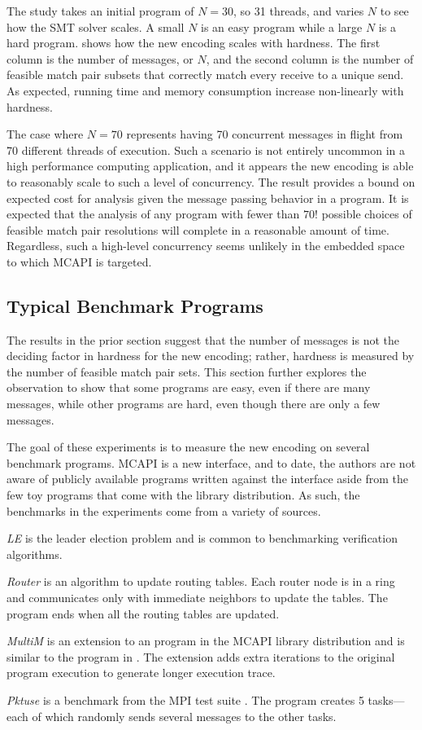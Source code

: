 The study takes an initial program of $N = 30$, so 31 threads, and
varies $N$ to see how the SMT solver scales. A small $N$ is an easy
program while a large $N$ is a hard program. 
shows how the new encoding scales with hardness. The first column is
the number of messages, or $N$, and the second column is the number of
feasible match pair subsets that correctly match every receive to a
unique send. As expected, running time and memory consumption increase
non-linearly with hardness.

The case where $N=70$ represents having 70 concurrent messages in
flight from 70 different threads of execution. Such a scenario is not
entirely uncommon in a high performance computing application, and it
appears the new encoding is able to reasonably scale to such a level
of concurrency. The result provides a bound on expected cost for
analysis given the message passing behavior in a program. It is
expected that the analysis of any program with fewer than $70!$
possible choices of feasible match pair resolutions will complete in a
reasonable amount of time. Regardless, such a high-level concurrency
seems unlikely in the embedded space to which MCAPI is targeted.

\subsection{Typical Benchmark Programs}
The results in the prior section suggest that the number of messages
is not the deciding factor in hardness for the new encoding; rather,
hardness is measured by the number of feasible match pair sets. This
section further explores the observation to show that some programs
are easy, even if there are many messages, while other programs are
hard, even though there are only a few messages.

The goal of these experiments is to measure the new encoding on
several benchmark programs. MCAPI is a new interface, and to date, the
authors are not aware of publicly available programs written against
the interface aside from the few toy programs that come with the
library distribution. As such, the benchmarks in the experiments come
from a variety of sources.
\begin{compactitem}
\item \textit{LE} is the leader election problem and is common to
  benchmarking verification algorithms.
\item \textit{Router} is an algorithm to update routing tables. Each
  router node is in a ring and communicates only with immediate
  neighbors to update the tables. The program ends when all the
  routing tables are updated.
\item \textit{MultiM} is an extension to an program in the MCAPI library
  distribution and is similar to the program in . The extension adds extra
  iterations to the original program execution to generate longer
  execution trace.
\item \textit{Pktuse} is a benchmark from the MPI test suite
  \cite{mpptest_benchmark}. The program creates 5 tasks---each of
  which randomly sends several messages to the other tasks.
\end{compactitem}

